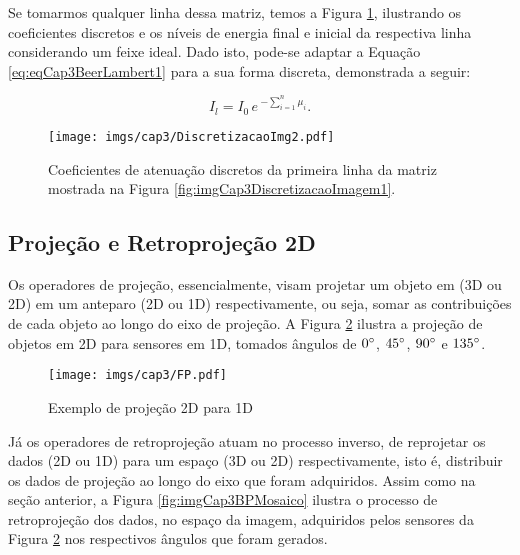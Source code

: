 Se tomarmos qualquer linha dessa matriz, temos a Figura \ref{fig:imgCap3DiscretizacaoImagem2}, ilustrando os coeficientes discretos e os níveis de energia final e inicial da respectiva linha considerando um feixe ideal. Dado isto, pode-se adaptar a Equação \ref{eq:eqCap3BeerLambert1} para a sua forma discreta, demonstrada a seguir:

\begin{equation}
I_{l} = I_{0} \, e \, ^{-\sum_{i=1}^{n} \mu_{i}}.
\label{eq:eqCap3BeerLambertDiscreto1}
\end{equation} 

\begin{figure}[H]
	\caption{Coeficientes de atenuação discretos da primeira linha da matriz mostrada na Figura \ref{fig:imgCap3DiscretizacaoImagem1}.}
	\begin{center}
		\texttt{[image: imgs/cap3/DiscretizacaoImg2.pdf]}
	\end{center}
	\label{fig:imgCap3DiscretizacaoImagem2}
\end{figure}

\subsection{Projeção e Retroprojeção 2D}

 Os operadores de projeção, essencialmente, visam projetar um objeto em (\acs{3D} ou \acs{2D}) em um anteparo (\acs{2D} ou \acs{1D}) respectivamente, ou seja, somar as contribuições de cada objeto ao longo do eixo de projeção. A Figura \ref{fig:imgCap3ProjeçãoDireta} ilustra a projeção de objetos em \acs{2D} para sensores em \acs{1D}, tomados ângulos de $0\degree$, $45\degree$, $90\degree$ e $135\degree$. 

\begin{figure}[H]
	\caption{Exemplo de projeção \acs{2D} para \acs{1D}}
	\begin{center}
		\texttt{[image: imgs/cap3/FP.pdf]}
	\end{center}
	\label{fig:imgCap3ProjeçãoDireta}
\end{figure}


Já os operadores de retroprojeção atuam no processo inverso, de reprojetar os dados (\acs{2D} ou \acs{1D}) para um espaço (\acs{3D} ou \acs{2D}) respectivamente, isto é, distribuir os dados de projeção ao longo do eixo que foram adquiridos. Assim como na seção anterior, a Figura \ref{fig:imgCap3BPMosaico} ilustra o processo de retroprojeção dos dados, no espaço da imagem, adquiridos pelos sensores da Figura \ref{fig:imgCap3ProjeçãoDireta} nos respectivos ângulos que foram gerados. 

